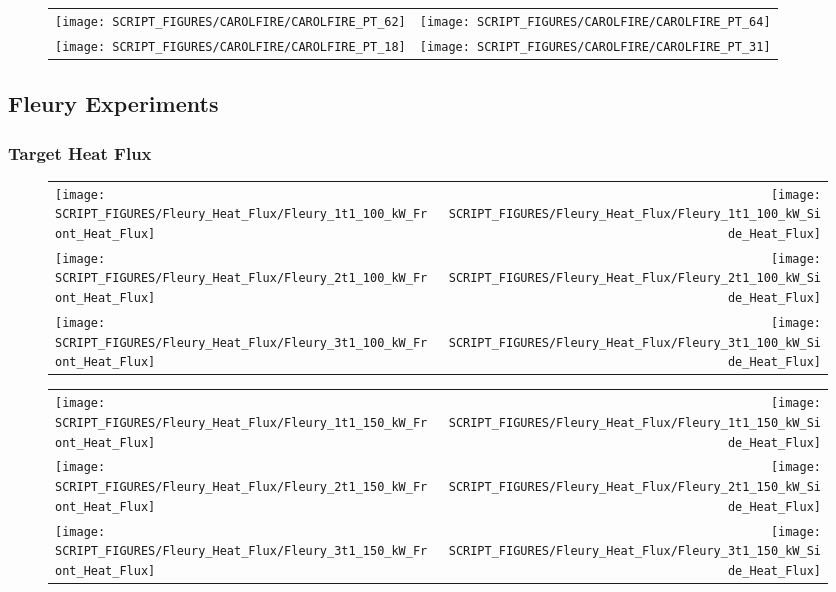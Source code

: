 \begin{figure}[!ht]
\begin{tabular*}{\textwidth}{l@{\extracolsep{\fill}}r}
\texttt{[image: SCRIPT\_FIGURES/CAROLFIRE/CAROLFIRE\_PT\_62]} &
\texttt{[image: SCRIPT\_FIGURES/CAROLFIRE/CAROLFIRE\_PT\_64]} \\
\texttt{[image: SCRIPT\_FIGURES/CAROLFIRE/CAROLFIRE\_PT\_18]} &
\texttt{[image: SCRIPT\_FIGURES/CAROLFIRE/CAROLFIRE\_PT\_31]}
\end{tabular*}
\label{CAROLFIRE_Special_1}
\end{figure}

\clearpage

\subsection{Fleury Experiments}

\subsubsection{Target Heat Flux}

\begin{figure}[!ht]
\begin{tabular*}{\textwidth}{l@{\extracolsep{\fill}}r}
\texttt{[image: SCRIPT\_FIGURES/Fleury\_Heat\_Flux/Fleury\_1t1\_100\_kW\_Front\_Heat\_Flux]} &
\texttt{[image: SCRIPT\_FIGURES/Fleury\_Heat\_Flux/Fleury\_1t1\_100\_kW\_Side\_Heat\_Flux]} \\
\texttt{[image: SCRIPT\_FIGURES/Fleury\_Heat\_Flux/Fleury\_2t1\_100\_kW\_Front\_Heat\_Flux]} &
\texttt{[image: SCRIPT\_FIGURES/Fleury\_Heat\_Flux/Fleury\_2t1\_100\_kW\_Side\_Heat\_Flux]} \\
\texttt{[image: SCRIPT\_FIGURES/Fleury\_Heat\_Flux/Fleury\_3t1\_100\_kW\_Front\_Heat\_Flux]} &
\texttt{[image: SCRIPT\_FIGURES/Fleury\_Heat\_Flux/Fleury\_3t1\_100\_kW\_Side\_Heat\_Flux]}
\end{tabular*}
\label{Fleury_Heat_Flux_100_kW}
\end{figure}

\newpage

\begin{figure}[!ht]
\begin{tabular*}{\textwidth}{l@{\extracolsep{\fill}}r}
\texttt{[image: SCRIPT\_FIGURES/Fleury\_Heat\_Flux/Fleury\_1t1\_150\_kW\_Front\_Heat\_Flux]} &
\texttt{[image: SCRIPT\_FIGURES/Fleury\_Heat\_Flux/Fleury\_1t1\_150\_kW\_Side\_Heat\_Flux]} \\
\texttt{[image: SCRIPT\_FIGURES/Fleury\_Heat\_Flux/Fleury\_2t1\_150\_kW\_Front\_Heat\_Flux]} &
\texttt{[image: SCRIPT\_FIGURES/Fleury\_Heat\_Flux/Fleury\_2t1\_150\_kW\_Side\_Heat\_Flux]} \\
\texttt{[image: SCRIPT\_FIGURES/Fleury\_Heat\_Flux/Fleury\_3t1\_150\_kW\_Front\_Heat\_Flux]} &
\texttt{[image: SCRIPT\_FIGURES/Fleury\_Heat\_Flux/Fleury\_3t1\_150\_kW\_Side\_Heat\_Flux]}
\end{tabular*}
\label{Fleury_Heat_Flux_150_kW}
\end{figure}

